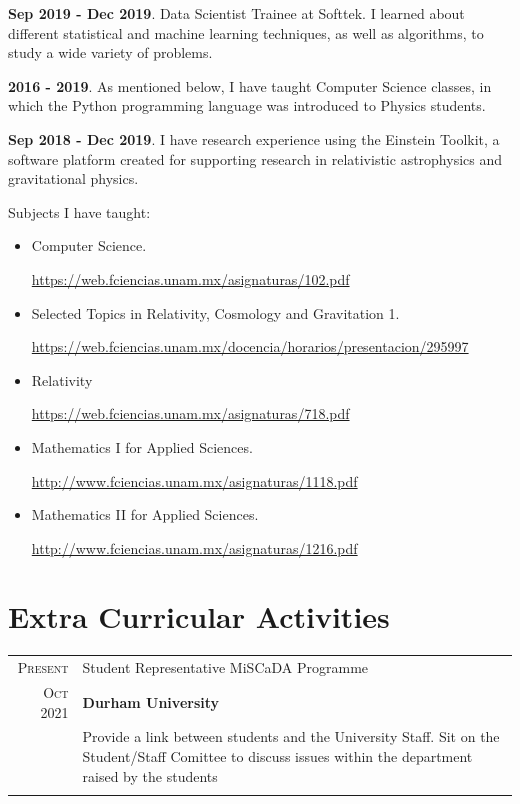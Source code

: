 \documentclass[a4paper,10pt]{article} %
\begin{document}
\textbf{Sep 2019 - Dec 2019}. Data Scientist Trainee at Softtek. I learned about different statistical and machine learning techniques, as well as algorithms, to study a wide variety of problems.

\textbf{2016 - 2019}. As mentioned below, I have taught Computer Science classes, in which the Python programming language was introduced to Physics students.

\textbf{Sep 2018 - Dec 2019}. I have research experience using the Einstein Toolkit, a software platform created for supporting research in relativistic astrophysics and gravitational physics.

Subjects I have taught:
\begin{itemize}
	\item Computer Science.
	
	\href{https://web.fciencias.unam.mx/asignaturas/102.pdf}{https://web.fciencias.unam.mx/asignaturas/102.pdf}
	
	\item Selected Topics in Relativity, Cosmology and Gravitation 1.
	
	\href{https://web.fciencias.unam.mx/docencia/horarios/presentacion/295997}{https://web.fciencias.unam.mx/docencia/horarios/presentacion/295997}
	
	\item Relativity
	
	\href{https://web.fciencias.unam.mx/asignaturas/718.pdf}{https://web.fciencias.unam.mx/asignaturas/718.pdf}
	
	\item Mathematics I for Applied Sciences. 
	
	\href{http://www.fciencias.unam.mx/asignaturas/1118.pdf}{http://www.fciencias.unam.mx/asignaturas/1118.pdf}
	
	\item Mathematics II for Applied Sciences.
	
	\href{http://www.fciencias.unam.mx/asignaturas/1216.pdf}{http://www.fciencias.unam.mx/asignaturas/1216.pdf}
\end{itemize}
\bigskip

\section{Extra Curricular Activities}
\bigskip
\begin{tabular}{r|p{11cm}}
	\textsc{Present} & Student Representative MiSCaDA Programme\\
	\textsc{Oct 2021}&\footnotesize{\textbf{Durham University}}\\
	&\footnotesize{Provide a link between students and the University Staff. Sit on the Student/Staff Comittee to discuss issues within the department raised by the students}\\
	\multicolumn{2}{c}{} \\
\end{tabular}
\end{document}
